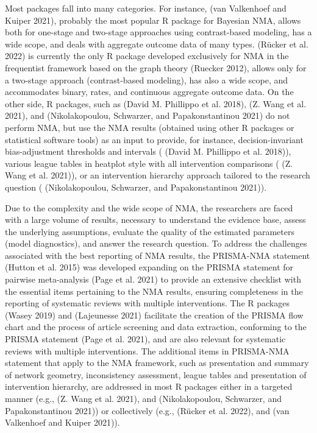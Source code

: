 Most packages fall into many categories. For instance, 
(van Valkenhoef and Kuiper 2021), probably the most popular R package for Bayesian NMA, allows both for
one-stage and two-stage approaches using contrast-based modeling, has a wide scope,
and deals with aggregate outcome data of many types.  (Rücker et al. 2022)
is currently the only R package developed exclusively for NMA in the frequentist
framework based on the graph theory (Ruecker 2012), allows only for a two-stage
approach (contrast-based modeling), has also a wide scope, and accommodates
binary, rates, and continuous aggregate outcome data. On the other side, R packages,
such as  (David M. Phillippo et al. 2018),  (Z. Wang et al. 2021),
and  (Nikolakopoulou, Schwarzer, and Papakonstantinou 2021) do not perform NMA, but use the NMA results (obtained
using other R packages or statistical software tools) as an input to provide, for
instance, decision-invariant bias-adjustment thresholds and intervals (
(David M. Phillippo et al. 2018)), various league tables in heatplot style with all intervention
comparisons ( (Z. Wang et al. 2021)), or an intervention hierarchy
approach tailored to the research question ( (Nikolakopoulou, Schwarzer, and Papakonstantinou 2021)).

Due to the complexity and the wide scope of NMA, the researchers are faced with
a large volume of results, necessary to understand the evidence base, assess the
underlying assumptions, evaluate the quality of the estimated parameters (model
diagnostics), and answer the research question. To address the challenges associated
with the best reporting of NMA results, the PRISMA-NMA statement (Hutton et al. 2015)
was developed expanding on the PRISMA statement for pairwise meta-analysis (Page et al. 2021)
to provide an extensive checklist with the essential items pertaining to the NMA
results, ensuring completeness in the reporting of systematic reviews with multiple
interventions. The R packages  (Wasey 2019) and
 (Lajeunesse 2021) facilitate the creation of the PRISMA flow chart
and the process of article screening and data extraction, conforming to the PRISMA
statement (Page et al. 2021), and are also relevant for systematic reviews with multiple
interventions. The additional items in PRISMA-NMA statement that apply to the NMA
framework, such as presentation and summary of network geometry, inconsistency
assessment, league tables and presentation of intervention hierarchy, are addressed
in most R packages either in a targeted manner (e.g., 
(Z. Wang et al. 2021), and  (Nikolakopoulou, Schwarzer, and Papakonstantinou 2021)) or collectively (e.g.,  (Rücker et al. 2022), and  (van Valkenhoef and Kuiper 2021)).


